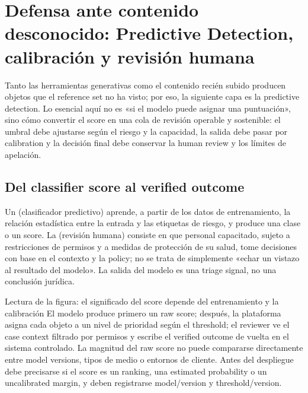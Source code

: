 \section{Defensa ante contenido desconocido: Predictive Detection, calibración y revisión humana}

Tanto las herramientas generativas como el contenido recién subido producen objetos que el reference set no ha visto; por eso, la siguiente capa es la predictive detection. Lo esencial aquí no es «si el modelo puede asignar una puntuación», sino cómo convertir el score en una cola de revisión operable y sostenible: el umbral debe ajustarse según el riesgo y la capacidad, la salida debe pasar por calibration y la decisión final debe conservar la human review y los límites de apelación.

\subsection{Del classifier score al verified outcome}

Un  (clasificador predictivo) aprende, a partir de los datos de entrenamiento, la relación estadística entre la entrada y las etiquetas de riesgo, y produce una clase o un score. La  (revisión humana) consiste en que personal capacitado, sujeto a restricciones de permisos y a medidas de protección de su salud, tome decisiones con base en el contexto y la policy; no se trata de simplemente «echar un vistazo al resultado del modelo». La salida del modelo es una triage signal, no una conclusión jurídica.


\begin{knowledgebox}{Lectura de la figura: el significado del score depende del entrenamiento y la calibración}
El modelo produce primero un raw score; después, la plataforma asigna cada objeto a un nivel de prioridad según el threshold; el reviewer ve el case context filtrado por permisos y escribe el verified outcome de vuelta en el sistema controlado. La magnitud del raw score no puede compararse directamente entre model versions, tipos de medio o entornos de cliente. Antes del despliegue debe precisarse si el score es un ranking, una estimated probability o un uncalibrated margin, y deben registrarse model/version y threshold/version.
\end{knowledgebox}

